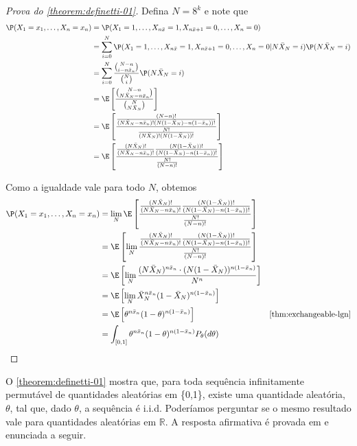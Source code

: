 \begin{proof}[Prova do \cref{theorem:definetti-01}]
 Defina $N = 8^k$ e note que
 \begin{align*}
  \P(X_{1}=x_{1},\ldots,X_{n}=x_{n})	
  &=\P(X_{1}=1,\ldots,X_{n\bar{x}}=1,X_{n\bar{x}+1}=0,\ldots,X_{n}=0) \\
  &= \sum_{i=0}^{N}{\P(X_{1}=1,\ldots,X_{n\bar{x}}=1,X_{n\bar{x}+1}=0,\ldots,X_{n}=0|N\bar{X}_{N} = i)\P(N\bar{X}_{N}=i)} \\
  &= \sum_{i=0}^{N} \frac{{N-n \choose i-n\bar{x}_n}}{{N \choose i}} \P(N\bar{X}_{N}=i) \\
  &= \E \left[ \frac{{N-n \choose N\bar{X}_N - n\bar{x}_n}}{{N \choose N\bar{X}_N}} \right] \\
  &= \E \left[ \frac{\frac{(N-n)!}{(N\bar{X}_N - n\bar{x}_n)!(N(1-\bar{X}_N)-n(1-\bar{x}_n))!}}
  {\frac{N!}{(N\bar{X}_N)!(N(1-\bar{X}_N))!}} \right] \\
  &= \E \left[ \frac{ \frac{(N\bar{X}_N)!}{(N\bar{X}_N - n\bar{x}_n)!}
  \frac{(N(1-\bar{X}_N))!}{(N(1-\bar{X}_N)-n(1-\bar{x}_n))!} }  {\frac{N!}{(N-n)!}} \right]
 \end{align*}
 
 Como a igualdade vale para todo $N$, obtemos
 \begin{align*}
  \P(X_{1}=x_{1},\ldots,X_{n}=x_{n})
  &= \lim_N \E \left[ \frac{ \frac{(N\bar{X}_N)!}{(N\bar{X}_N - n\bar{x}_n)!}
  \frac{(N(1-\bar{X}_N))!}{(N(1-\bar{X}_N)-n(1-\bar{x}_n))!} }  {\frac{N!}{(N-n)!}} \right] \\
  &= \E \left[\lim_N \frac{ \frac{(N\bar{X}_N)!}{(N\bar{X}_N - n\bar{x}_n)!}
  \frac{(N(1-\bar{X}_N))!}{(N(1-\bar{X}_N)-n(1-\bar{x}_n))!} }  {\frac{N!}{(N-n)!}} \right] \\
  &= \E \left[\lim_N \frac{(N\bar{X}_N)^{n\bar{x}_n} \cdot (N(1-\bar{X}_N))^{n(1-\bar{x}_n)}}{N^n}\right] \\
  &= \E \left[\lim_N \bar{X}_N^{n\bar{x}_n}(1-\bar{X}_N)^{n(1-\bar{x}_n)} \right] \\
  &= \E \left[\theta^{n\bar{x}_n}(1-\theta)^{n(1-\bar{x}_n)} \right]
  & \text{\cref{thm:exchangeable-lgn}} \\
  &= \int_{[0,1]}{\theta^{n\bar{x}_n}(1-\theta)^{n(1-\bar{x}_n)}P_{\theta}(d\theta)}
 \end{align*}
\end{proof}

O \cref{theorem:definetti-01} mostra que,
para toda sequência infinitamente permutável
de quantidades aleatórias em \{0,1\},
existe uma quantidade aleatória, $\theta$,
tal que, dado $\theta$, a sequência é i.i.d.
Poderíamos perguntar se o mesmo resultado vale
para quantidades aleatórias em $\mathbb{R}$.
A resposta afirmativa é provada em
\citet{Finetti1937} e enunciada a seguir.


